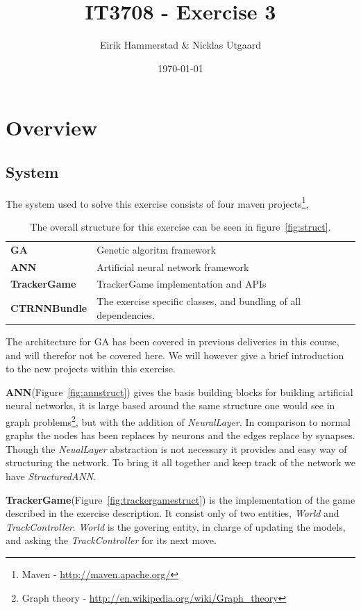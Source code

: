 \documentclass[12pt]{article}
\title{IT3708 - Exercise 3}
\author{
        Eirik Hammerstad \& Nicklas Utgaard
}
\date{\today}
\begin{document}
\maketitle
\section{Overview}
	\subsection{System}
		The system used to solve this exercise consists of four maven projects\footnote{Maven - \url{http://maven.apache.org/}}, 
		\begin{table}[H]
			\begin{tabular}{ll}
				\textbf{GA} & Genetic algoritm framework\\
				\textbf{ANN} & Artificial neural network framework\\
				\textbf{TrackerGame} & TrackerGame implementation and APIs\\
				\textbf{CTRNNBundle} & The exercise specific classes, and bundling of all dependencies.
			\end{tabular}
			\caption{The overall structure for this exercise can be seen in figure~\ref{fig:struct}.}
			\label{tabel:project}
		\end{table}
The architecture for GA has been covered in previous deliveries in this course, and will therefor not be covered here. We will however give a brief introduction to the new projects within this exercise. 
		
	\textbf{ANN}(Figure~\ref{fig:annstruct}) gives the basis building blocks for building artificial neural networks, it is large based around the same structure one would see in graph problems\footnote{Graph theory - \url{http://en.wikipedia.org/wiki/Graph_theory}}, but with the addition of \textit{NeuralLayer}. In comparison to normal graphs the nodes has been replaces by neurons and the edges replace by synapses. Though the \textit{NeualLayer} abstraction is not necessary it provides and easy way of structuring the network. To bring it all together and keep track of the network we have \textit{StructuredANN}.

		\textbf{TrackerGame}(Figure~\ref{fig:trackergamestruct}) is the implementation of the game described in the exercise description. It consist only of two entities, \textit{World} and \textit{TrackController}. \textit{World} is the govering entity, in charge of updating the models, and asking the \textit{TrackController} for its next move. 
\end{document}
